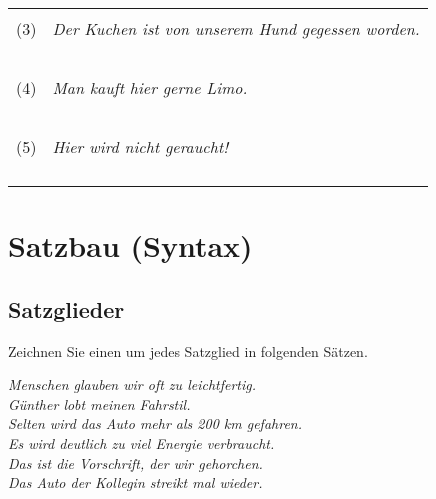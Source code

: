\documentclass[12pt,a4paper,twoside]{article}
\newcommand{\FUBreak}{\clearpage}
\newcommand{\FUZeile}{\hspace{\baselineskip}}
\newcommand{\FUBreak}{}
\newcommand{\FUZeile}{}
\newcommand*{\mybox}[1]{\framebox{#1}}
\begin{document}
\begin{center}
  \begin{tabular}[h]{cp{}}
    & \\
    (3) & \textit{Der Kuchen ist von unserem Hund gegessen worden.} \\
    & \\
    &\\\cline{2-2}
    & \\
    &\\\cline{2-2}
    & \\
    (4) & \textit{Man kauft hier gerne Limo.} \\
    & \\
    &\\\cline{2-2}
    & \\
    &\\\cline{2-2}
    & \\
    (5) & \textit{Hier wird nicht geraucht!} \\
    & \\
    &\\\cline{2-2}
    & \\
    &\\\cline{2-2}
  \end{tabular}
\end{center}

\FUBreak

\section{Satzbau (Syntax)}

\FUZeile

\subsection{Satzglieder}

Zeichnen Sie einen \mybox{Kasten} um jedes Satzglied in folgenden Sätzen.

\begin{exe}
  \setcounter{xnumi}{0}
  \ex \textit{Menschen glauben wir oft zu leichtfertig.}\\

  \ex \textit{Günther lobt meinen Fahrstil.}\\

  \ex \textit{Selten wird das Auto mehr als 200 km gefahren.}\\

  \ex \textit{Es wird deutlich zu viel Energie verbraucht.}\\

  \ex \textit{Das ist die Vorschrift, der wir gehorchen.}\\

  \ex \textit{Das Auto der Kollegin streikt mal wieder.}
\end{exe}
\end{document}
